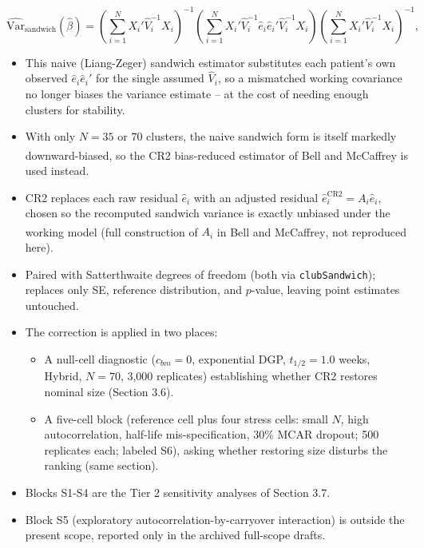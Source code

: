 \documentclass[
  11pt,
]{article}
\providecommand{\tightlist}{%
  \setlength{\itemsep}{0pt}\setlength{\parskip}{0pt}}
\begin{document}
\[
\widehat{\text{Var}}_{\text{sandwich}}(\hat\beta) =
  \left(\sum_{i=1}^{N} X_i' \hat{V}_i^{-1} X_i\right)^{-1}
  \left(\sum_{i=1}^{N} X_i' \hat{V}_i^{-1} \hat{e}_i \hat{e}_i'
    \hat{V}_i^{-1} X_i\right)
  \left(\sum_{i=1}^{N} X_i' \hat{V}_i^{-1} X_i\right)^{-1},
\]

\begin{itemize}
\tightlist
\item
  This naive (Liang-Zeger) sandwich estimator substitutes each
  patient's own observed \(\hat{e}_i\hat{e}_i'\) for the single assumed
  \(\hat{V}_i\), so a mismatched working covariance no longer biases the
  variance estimate -- at the cost of needing enough clusters for
  stability.
\item
  With only \(N = 35\) or \(70\) clusters, the naive sandwich form is
  itself markedly downward-biased, so the CR2 bias-reduced estimator
  of Bell and McCaffrey\textsuperscript{} is used instead.
\item
  CR2 replaces each raw residual \(\hat{e}_i\) with an adjusted residual
  \(\hat{e}_i^{\text{CR2}} = A_i \hat{e}_i\), chosen so the recomputed
  sandwich variance is exactly unbiased under the working model (full
  construction of \(A_i\) in Bell and McCaffrey\textsuperscript{}, not
  reproduced here).
\item
  Paired with Satterthwaite degrees of freedom (both via
  \texttt{clubSandwich}); replaces only SE, reference distribution, and
  \(p\)-value, leaving point estimates untouched.
\item
  The correction is applied in two places:

  \begin{itemize}
  \tightlist
  \item
    A null-cell diagnostic (\(c_{bm} = 0\), exponential DGP,
    \(t_{1/2} = 1.0\) weeks, Hybrid, \(N = 70\), 3,000 replicates)
    establishing whether CR2 restores nominal size (Section 3.6).
  \item
    A five-cell block (reference cell plus four stress cells: small
    \(N\), high autocorrelation, half-life mis-specification, 30\% MCAR
    dropout; 500 replicates each; labeled S6), asking whether
    restoring size disturbs the ranking (same section).
  \end{itemize}
\item
  Blocks S1-S4 are the Tier 2 sensitivity analyses of Section 3.7.
\item
  Block S5 (exploratory autocorrelation-by-carryover interaction) is
  outside the present scope, reported only in the archived
  full-scope drafts.
\end{itemize}
\end{document}
